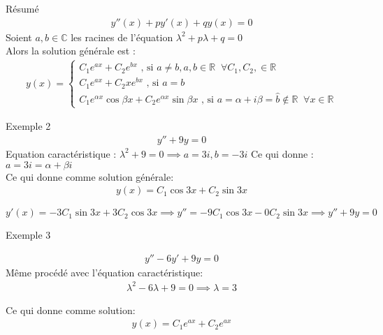     \begin{parag}{Résumé}
        \begin{align*}
            y''(x) + py'(x) + q y(x) = 0
        \end{align*}
        Soient $a, b \in \mathbb{C}$ les racines de l'équation $ \lambda^2 + p \lambda + q = 0$
    \\
    Alors la solution générale est : 
    \begin{align*}
        y(x) = \begin{cases}
                C_1 e^{ax} + C_2 e^{bx} \text{ , si } a \neq b, a, b \in \mathbb{R} \; \; \forall C_1, C_2, \in \mathbb{R} \\
                C_1e^{ax} + C_2xe^{bx} \text{ , si } a = b \\
                C_1e^{ \alpha x} \cos \beta x + C_2 e^{ \alpha x} \sin \beta x \text{ , si } a = \alpha + i \beta = \hat{b} \notin \mathbb{R} \; \; \forall x \in \mathbb{R}
                            
        \end{cases}
    \end{align*}
    
    \begin{subparag}{Exemple 2}
       \begin{align*}
           y'' + 9y = 0
       \end{align*}
       Equation caractéristique : $ \lambda^2 + 9 = 0 \implies a = 3i, b = -3i$ Ce qui donne : $a = 3i = \alpha + \beta i$
       \\
       Ce qui donne comme solution générale:
       \begin{align*}
           y(x) = C_1 \cos 3x + C_2 \sin 3x
       \end{align*}
       
     $y'(x) = -3C_1\sin 3x + 3C_2\cos 3x \implies y'' = -9C_1 \cos 3x - 0 C_2 \sin 3x \implies y'' + 9y = 0$
    \end{subparag}
    \begin{subparag}{Exemple 3}
        
        \begin{align*}
            y'' -6y' + 9y = 0
        \end{align*}
        Même procédé avec l'équation caractéristique:
        \begin{align*}
            \lambda^2 - 6 \lambda + 9 = 0 \implies \lambda = 3
        \end{align*}
        
        Ce qui donne comme solution:
        \begin{align*}
            y(x) = C_1 e^{ ax} + C_2 e^{ax}
        \end{align*}
    \end{subparag}
    \end{parag}
    
